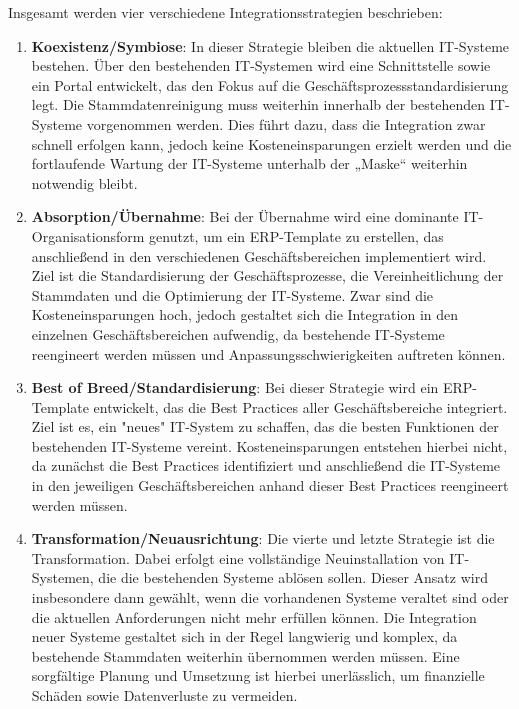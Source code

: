 \documentclass[a4paper,12pt]{article}
\begin{document}
Insgesamt werden vier verschiedene Integrationsstrategien beschrieben:
\begin{enumerate}
    \item \textbf{Koexistenz/Symbiose}: \newline
    In dieser Strategie bleiben die aktuellen IT-Systeme bestehen.
    Über den bestehenden IT-Systemen wird eine Schnittstelle sowie ein Portal entwickelt, das den Fokus auf die Geschäftsprozessstandardisierung legt.
    Die Stammdatenreinigung muss weiterhin innerhalb der bestehenden IT-Systeme vorgenommen werden.
    Dies führt dazu, dass die Integration zwar schnell erfolgen kann, 
    jedoch keine Kosteneinsparungen erzielt werden und die fortlaufende Wartung der IT-Systeme 
    unterhalb der „Maske“ weiterhin notwendig bleibt. 
    \item \textbf{Absorption/Übernahme}:\newline
    Bei der Übernahme wird eine dominante IT-Organisationsform genutzt, um ein ERP-Template zu erstellen,
    das anschließend in den verschiedenen Geschäftsbereichen implementiert wird. Ziel ist die Standardisierung der Geschäftsprozesse,
    die Vereinheitlichung der Stammdaten und die Optimierung der IT-Systeme.
    Zwar sind die Kosteneinsparungen hoch, jedoch gestaltet sich die Integration in den einzelnen Geschäftsbereichen aufwendig,
    da bestehende IT-Systeme reengineert werden müssen und Anpassungsschwierigkeiten auftreten können.
    \item \textbf{Best of Breed/Standardisierung}:\newline
    Bei dieser Strategie wird ein ERP-Template entwickelt, das die Best Practices aller Geschäftsbereiche integriert.
    Ziel ist es, ein "neues" IT-System zu schaffen, das die besten Funktionen der bestehenden IT-Systeme vereint.
    Kosteneinsparungen entstehen hierbei nicht, da zunächst die Best Practices identifiziert und anschließend die IT-Systeme
    in den jeweiligen Geschäftsbereichen anhand dieser Best Practices reengineert werden müssen.
    \item \textbf{Transformation/Neuausrichtung}:\newline
    Die vierte und letzte Strategie ist die Transformation.
    Dabei erfolgt eine vollständige Neuinstallation von IT-Systemen, die die bestehenden Systeme ablösen sollen.
    Dieser Ansatz wird insbesondere dann gewählt, wenn die vorhandenen Systeme veraltet sind oder die aktuellen Anforderungen nicht mehr erfüllen können.
    Die Integration neuer Systeme gestaltet sich in der Regel langwierig und komplex, da bestehende Stammdaten weiterhin übernommen werden müssen.
    Eine sorgfältige Planung und Umsetzung ist hierbei unerlässlich, um finanzielle Schäden sowie Datenverluste zu vermeiden.
\end{enumerate}
\cite[Kapitel 9.5.3]{Gronwald2020}
\end{document}
